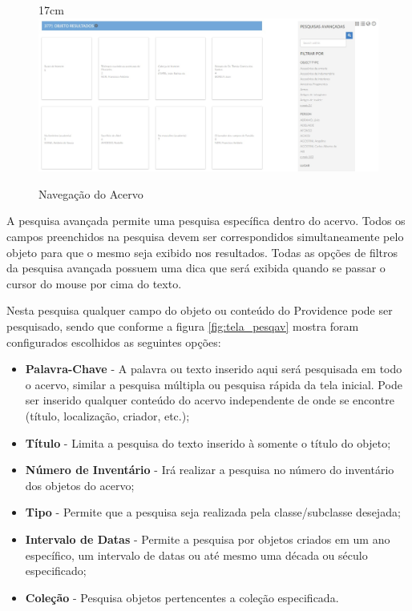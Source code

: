 \documentclass[a4paper,12pt,oneside,onecolumn,final,fleqn]{repUERJ}
\begin{document}
\begin{figure}[!ht]{17cm}
	\includegraphics[width=15cm, center]{figuras/pawtucket_navegarobjetos.jpg}
	\caption{Navegação do Acervo} \label{fig:tela_navobj}
\end{figure}

A pesquisa avançada permite uma pesquisa específica dentro do acervo. Todos os campos preenchidos na pesquisa devem ser correspondidos simultaneamente pelo objeto para que o mesmo seja exibido nos resultados. Todas as opções de filtros da pesquisa avançada possuem uma dica que será exibida quando se passar o cursor do mouse por cima do texto.

Nesta pesquisa qualquer campo do objeto ou conteúdo do Providence pode ser pesquisado, sendo que conforme a figura \ref{fig:tela_pesqav} mostra foram configurados escolhidos as seguintes opções:

\begin{itemize}
	\item \textbf{Palavra-Chave} - A palavra ou texto inserido aqui será pesquisada em todo o acervo, similar a pesquisa múltipla ou pesquisa rápida da tela inicial. Pode ser inserido qualquer conteúdo do acervo independente de onde se encontre (título, localização, criador, etc.);
	\item \textbf{Título} - Limita a pesquisa do texto inserido à somente o título do objeto;
	\item \textbf{Número de Inventário} - Irá realizar a pesquisa no número do inventário dos objetos do acervo;
	\item \textbf{Tipo} - Permite que a pesquisa seja realizada pela classe/subclasse desejada;
	\item \textbf{Intervalo de Datas} - Permite a pesquisa por objetos criados em um ano específico, um intervalo de datas ou até mesmo uma década ou século especificado;
	\item \textbf{Coleção} - Pesquisa objetos pertencentes a coleção especificada.
\end{itemize}
\end{document}
